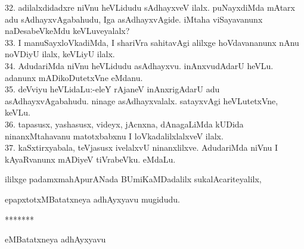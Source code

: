 \documentclass{article}
\begin{document}
32. adilalxdidadxre niVnu heVLidudu sAdhayxveV ilalx. puNayxdiMda mAtarx adu sAdhayxvAgabahudu, Iga asAdhayxvAgide. iMtaha viSayavanunx naDesabeVkeMdu keVLuveyalalx?\\
33. I manuSayxloVkadiMda, I shariVra sahitavAgi alilxge hoVdavananunx nAnu noVDiyU ilalx, keVLiyU ilalx.\\
34. AdudariMda niVnu heVLidudu asAdhayxvu. inAnxvudAdarU heVLu. adanunx mADikoDutetxVne eMdanu.\\
35. deVviyu heVLidaLu:-eleY rAjaneV inAnxrigAdarU adu asAdhayxvAgabahudu. ninage asAdhayxvalalx. satayxvAgi heVLutetxVne, keVLu.\\
36. tapasusx, yashasusx, videyx, jAcnxna, dAnagaLiMda kUDida ninanxMtahavanu matotxbabxnu I loVkadalilxlalxveV ilalx.\\
37. kaSxtirxyabala, teVjasusx ivelalxvU ninanxlilxve. AdudariMda niVnu I kAyaRvanunx mADiyeV tiVrabeVku. eMdaLu.\\

\begin{center}
ililxge padamxmahApurANada BUmiKaMDadalilx sukalAcariteyalilx,
\end{center}

\begin{center}
epapxtotxMBatatxneya adhAyxyavu mugidudu.
\end{center}

\begin{center}
*******
\end{center}

\begin{center}
eMBatatxneya adhAyxyavu
\end{center}
\end{document}
